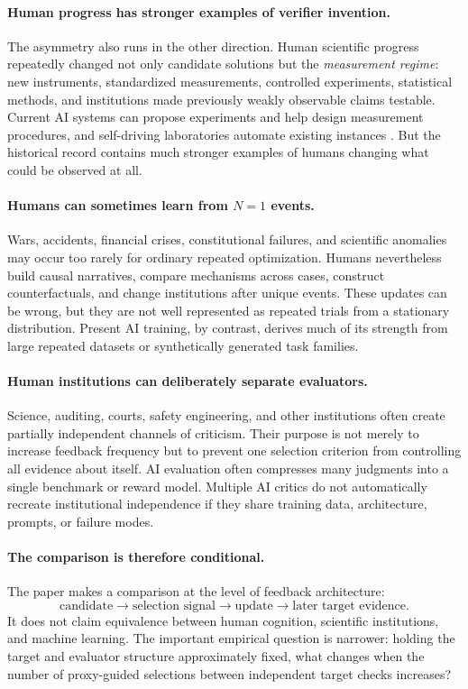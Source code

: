 \paragraph{Human progress has stronger examples of verifier invention.}
The asymmetry also runs in the other direction.  Human scientific progress repeatedly
changed not only candidate solutions but the \emph{measurement regime}: new
instruments, standardized measurements, controlled experiments, statistical methods,
and institutions made previously weakly observable claims testable.  Current AI
systems can propose experiments and help design measurement procedures, and
self-driving laboratories automate existing instances
\parencite{volk2023alphaflow,szymanski2023alab}.  But the historical record contains much
stronger examples of humans changing what could be observed at all.

\paragraph{Humans can sometimes learn from \(N=1\) events.}
Wars, accidents, financial crises, constitutional failures, and scientific anomalies
may occur too rarely for ordinary repeated optimization.  Humans nevertheless build
causal narratives, compare mechanisms across cases, construct counterfactuals, and
change institutions after unique events.  These updates can be wrong, but they are not
well represented as repeated trials from a stationary distribution.  Present AI
training, by contrast, derives much of its strength from large repeated datasets or
synthetically generated task families.

\paragraph{Human institutions can deliberately separate evaluators.}
Science, auditing, courts, safety engineering, and other institutions often create
partially independent channels of criticism.  Their purpose is not merely to increase
feedback frequency but to prevent one selection criterion from controlling all
evidence about itself.  AI evaluation often compresses many judgments into a single
benchmark or reward model.  Multiple AI critics do not automatically recreate
institutional independence if they share training data, architecture, prompts, or
failure modes.

\paragraph{The comparison is therefore conditional.}
The paper makes a comparison at the level of feedback architecture:
\[
    \text{candidate}
    \rightarrow
    \text{selection signal}
    \rightarrow
    \text{update}
    \rightarrow
    \text{later target evidence}.
\]
It does not claim equivalence between human cognition, scientific institutions, and
machine learning.  The important empirical question is narrower: holding the target
and evaluator structure approximately fixed, what changes when the number of
proxy-guided selections between independent target checks increases?

